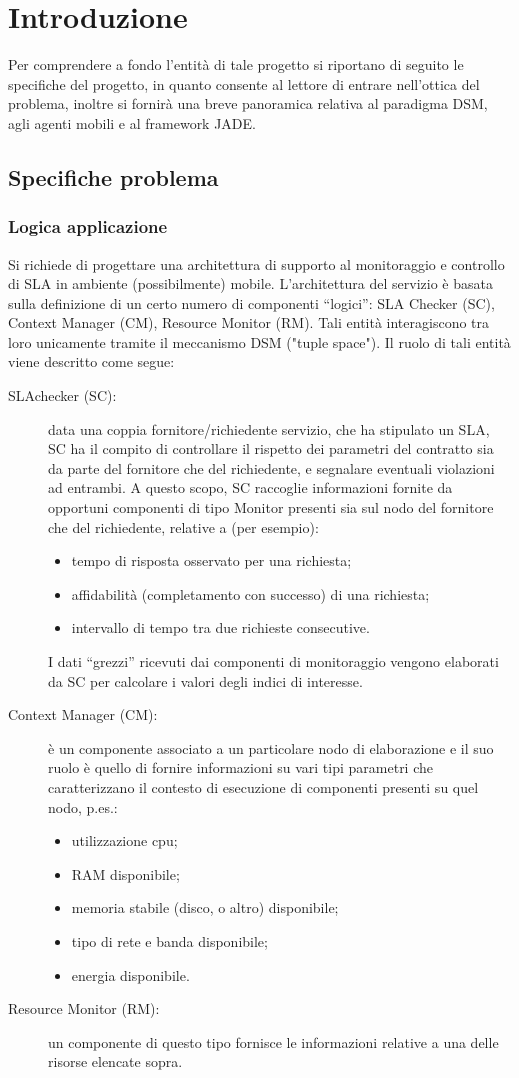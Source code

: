 \chapter{Introduzione}\label{cap:introduzione}
Per comprendere a fondo l'entità di tale progetto si riportano di seguito le specifiche del progetto, in quanto consente al lettore di entrare nell'ottica del problema, inoltre si fornirà una breve panoramica relativa al paradigma DSM, agli agenti mobili e al framework JADE.
\section{Specifiche problema}
\subsection{Logica applicazione}
Si richiede di progettare una architettura di supporto al monitoraggio e controllo di SLA\cite{gino} in ambiente (possibilmente) mobile. L’architettura del servizio è basata sulla definizione di un certo numero di componenti “logici”: SLA Checker (SC), Context Manager (CM), Resource Monitor (RM). Tali entità interagiscono tra loro unicamente tramite il meccanismo DSM ("tuple space"). Il ruolo di tali entità viene descritto come segue:
\begin{description}
\item[SLAchecker (SC):] data una coppia fornitore/richiedente servizio, che ha stipulato un SLA, SC ha il compito di controllare il rispetto dei parametri del contratto sia da parte del fornitore che del richiedente, e segnalare eventuali violazioni ad entrambi. A questo scopo, SC raccoglie informazioni fornite da opportuni componenti di tipo Monitor presenti sia sul nodo del fornitore che del richiedente, relative a (per esempio):
\begin{itemize}
\item tempo di risposta osservato per una richiesta;
\item affidabilità (completamento con successo) di una richiesta;
\item intervallo di tempo tra due richieste consecutive.
\end{itemize}
I dati “grezzi” ricevuti dai componenti di monitoraggio vengono elaborati da SC per calcolare i valori degli indici di interesse.
\item[Context Manager (CM):] è un componente associato a un particolare nodo di elaborazione e il suo ruolo è quello di fornire informazioni su vari tipi parametri che caratterizzano il contesto di esecuzione di componenti presenti su quel nodo, p.es.:
\begin{itemize}
\item utilizzazione cpu;
\item RAM disponibile;
\item memoria stabile (disco, o altro) disponibile;
\item tipo di rete e banda disponibile;
\item energia disponibile.
\end{itemize}
\item[Resource Monitor (RM):] un componente di questo tipo fornisce le informazioni relative a una delle risorse elencate sopra.
\end{description}
